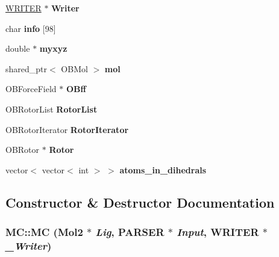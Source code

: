 \begin{DoxyCompactItemize}
\item 
\hypertarget{classMC_ae13581ab0768a19fc241a7844dec60f4}{
\hyperlink{classWRITER}{WRITER} $\ast$ {\bfseries Writer}}
\label{classMC_ae13581ab0768a19fc241a7844dec60f4}

\item 
\hypertarget{classMC_a1d8424cd5387c7bf4207de279602ef46}{
char {\bfseries info} \mbox{[}98\mbox{]}}
\label{classMC_a1d8424cd5387c7bf4207de279602ef46}

\item 
\hypertarget{classMC_aeb4d6769618676779035f02849743bf2}{
double $\ast$ {\bfseries myxyz}}
\label{classMC_aeb4d6769618676779035f02849743bf2}

\item 
\hypertarget{classMC_a09cd7fbfa04ce737d2b2be5b0f6b3e06}{
shared\_\-ptr$<$ OBMol $>$ {\bfseries mol}}
\label{classMC_a09cd7fbfa04ce737d2b2be5b0f6b3e06}

\item 
\hypertarget{classMC_af9eceb4ac7055a4f1f253414128b1d7a}{
OBForceField $\ast$ {\bfseries OBff}}
\label{classMC_af9eceb4ac7055a4f1f253414128b1d7a}

\item 
\hypertarget{classMC_a4259fe3f9c779287020dd71064dcb753}{
OBRotorList {\bfseries RotorList}}
\label{classMC_a4259fe3f9c779287020dd71064dcb753}

\item 
\hypertarget{classMC_a119e673dff0b8ed425ad29d876a2aefa}{
OBRotorIterator {\bfseries RotorIterator}}
\label{classMC_a119e673dff0b8ed425ad29d876a2aefa}

\item 
\hypertarget{classMC_aa08ef2f6614cd86a223122054fd5f967}{
OBRotor $\ast$ {\bfseries Rotor}}
\label{classMC_aa08ef2f6614cd86a223122054fd5f967}

\item 
\hypertarget{classMC_a216625c1c37e743a4125168ba0e5c645}{
vector$<$ vector$<$ int $>$ $>$ {\bfseries atoms\_\-in\_\-dihedrals}}
\label{classMC_a216625c1c37e743a4125168ba0e5c645}

\end{DoxyCompactItemize}


\subsection{Constructor \& Destructor Documentation}
\hypertarget{classMC_ac8c6a1cf2db2bd5582668077b2c22db1}{
\subsubsection[{MC}]{\setlength{\rightskip}{0pt plus 5cm}MC::MC ({\bf Mol2} $\ast$ {\em Lig}, \/  {\bf PARSER} $\ast$ {\em Input}, \/  {\bf WRITER} $\ast$ {\em \_\-Writer})}}
\label{classMC_ac8c6a1cf2db2bd5582668077b2c22db1}


